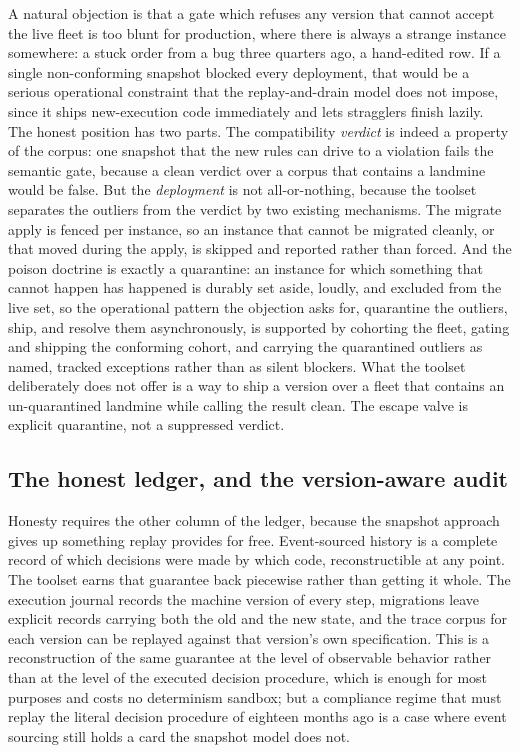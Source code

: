 \documentclass[11pt]{article}
\begin{document}
A natural objection is that a gate which refuses any version that cannot accept
the live fleet is too blunt for production, where there is always a strange
instance somewhere: a stuck order from a bug three quarters ago, a hand-edited
row. If a single non-conforming snapshot blocked every deployment, that would be
a serious operational constraint that the replay-and-drain model does not impose,
since it ships new-execution code immediately and lets stragglers finish lazily.
The honest position has two parts. The compatibility \emph{verdict} is indeed a
property of the corpus: one snapshot that the new rules can drive to a violation
fails the semantic gate, because a clean verdict over a corpus that contains a
landmine would be false. But the \emph{deployment} is not all-or-nothing, because
the toolset separates the outliers from the verdict by two existing mechanisms.
The migrate apply is fenced per instance, so an instance that cannot be migrated
cleanly, or that moved during the apply, is skipped and reported rather than
forced. And the poison doctrine is exactly a quarantine: an instance for which
something that cannot happen has happened is durably set aside, loudly, and
excluded from the live set, so the operational pattern the objection asks for,
quarantine the outliers, ship, and resolve them asynchronously, is supported by
cohorting the fleet, gating and shipping the conforming cohort, and carrying the
quarantined outliers as named, tracked exceptions rather than as silent blockers.
What the toolset deliberately does not offer is a way to ship a version over a
fleet that contains an un-quarantined landmine while calling the result clean.
The escape valve is explicit quarantine, not a suppressed verdict.

\subsection{The honest ledger, and the version-aware audit}

Honesty requires the other column of the ledger, because the snapshot approach
gives up something replay provides for free. Event-sourced history is a complete
record of which decisions were made by which code, reconstructible at any point.
The toolset earns that guarantee back piecewise rather than getting it whole. The
execution journal records the machine version of every step, migrations leave
explicit records carrying both the old and the new state, and the trace corpus
for each version can be replayed against that version's own specification. This
is a reconstruction of the same guarantee at the level of observable behavior
rather than at the level of the executed decision procedure, which is enough for
most purposes and costs no determinism sandbox; but a compliance regime that
must replay the literal decision procedure of eighteen months ago is a case where
event sourcing still holds a card the snapshot model does not.
\end{document}
